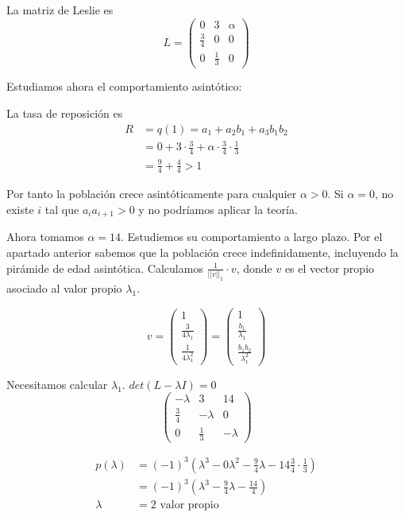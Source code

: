         La matriz de Leslie es $$L = \begin{pmatrix}
            0 & 3 & \alpha \\
            \frac{3}{4} & 0 & 0 \\
            0 & \frac{1}{3} & 0
        \end{pmatrix}$$

        Estudiamos ahora el comportamiento asintótico:

        La tasa de reposición es \begin{align*}
            R &= q(1) = a_1 + a_2b_1 + a_3b_1b_2 \\
              &= 0 + 3 \cdot \frac{3}{4} + \alpha \cdot \frac{3}{4}\cdot \frac{1}{3} \\
              &= \frac{9}{4}+\frac{4}{4} > 1
        \end{align*}

        Por tanto la población crece asintóticamente para cualquier $\alpha > 0$.
        Si $\alpha = 0$, no existe $i$ tal que $a_ia_{i+1} > 0$ y no podríamos aplicar la teoría.


        Ahora tomamos $\alpha = 14$. Estudiemos su comportamiento a largo plazo. Por el apartado anterior sabemos que la población crece indefinidamente, incluyendo la pirámide de edad asintótica. Calculamos $\frac{1}{||v||_1} \cdot v$, donde $v$ es el vector propio asociado al valor propio $\lambda_1$.

        $$ v = \begin{pmatrix}
            1 \\
            \frac{3}{4\lambda_1} \\
            \frac{1}{4\lambda_1^2}
        \end{pmatrix} = \begin{pmatrix}
            1 \\
            \frac{b_1}{\lambda_1} \\
            \frac{b_1b_2}{\lambda_1^2}
        \end{pmatrix}$$

        Necesitamos calcular $\lambda_1$. $det(L - \lambda I) = 0$ $$ \begin{pmatrix}
            -\lambda & 3 & 14 \\
            \frac{3}{4} & -\lambda & 0 \\
            0 & \frac{1}{3} & -\lambda
        \end{pmatrix}$$

        \begin{align*}
            p(\lambda) &= (-1)^3\left(\lambda^3 - 0\lambda^2 - \frac{9}{4}\lambda - 14 \frac{3}{4}\cdot \frac{1}{3}\right) \\
                       &= (-1)^3\left(\lambda^3-\frac{9}{4}\lambda - \frac{14}{4}\right) \\
            \lambda &= 2 \text{ valor propio }
        \end{align*}


